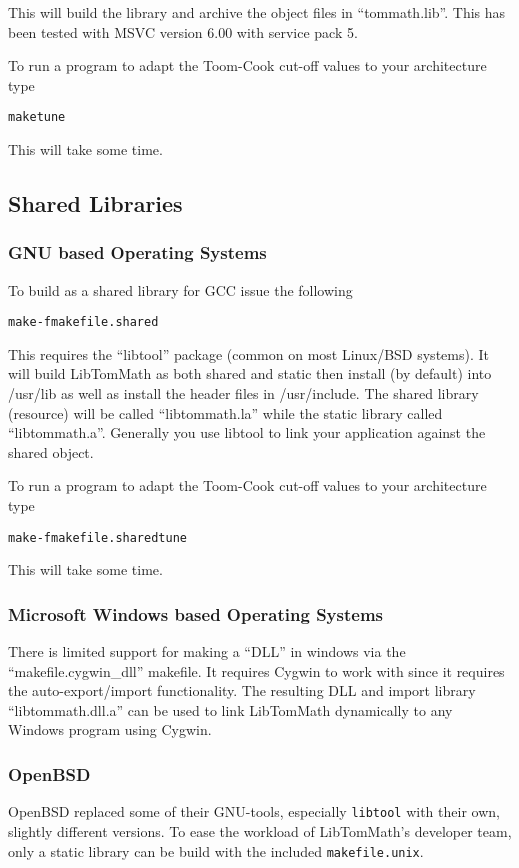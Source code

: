 \documentclass[synpaper]{book}
\begin{document}
This will build the library and archive the object files in ``tommath.lib''.  This has been tested with MSVC
version 6.00 with service pack 5.

To run a program to adapt the Toom-Cook cut-off values to your architecture type
\begin{alltt}
make tune
\end{alltt}
This will take some time.

\subsection{Shared Libraries}
\subsubsection{GNU based Operating Systems}
To build as a shared library for GCC issue the following
\begin{alltt}
make -f makefile.shared
\end{alltt}
This requires the ``libtool'' package (common on most Linux/BSD systems).  It will build LibTomMath as both shared
and static then install (by default) into /usr/lib as well as install the header files in /usr/include.  The shared
library (resource) will be called ``libtommath.la'' while the static library called ``libtommath.a''.  Generally
you use libtool to link your application against the shared object.

To run a program to adapt the Toom-Cook cut-off values to your architecture type
\begin{alltt}
make -f makefile.shared tune
\end{alltt}
This will take some time.

\subsubsection{Microsoft Windows based Operating Systems}
There is limited support for making a ``DLL'' in windows via the ``makefile.cygwin\_dll'' makefile.  It requires
Cygwin to work with since it requires the auto-export/import functionality.  The resulting DLL and import library
``libtommath.dll.a'' can be used to link LibTomMath dynamically to any Windows program using Cygwin.
\subsubsection{OpenBSD}
OpenBSD replaced some of their GNU-tools, especially \texttt{libtool} with their own, slightly different versions. To ease the workload of LibTomMath's developer team, only a static library can be build with the included \texttt{makefile.unix}.
\end{document}
